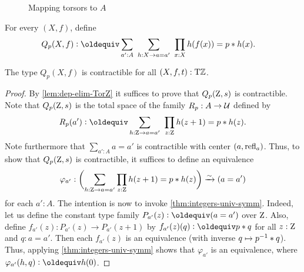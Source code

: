 \documentclass[a4paper,12pt]{amsart}
\begin{document}
\begin{figure}

\caption{\label{fig:TorZ-recursion}Mapping torsors to $A$}
\end{figure}

\begin{definition}\label{def:guided-null-hmtps}
For every $(X,f)$, define
\begin{align*}\label{eq:TBD}
Q_p(X,f)&\defeq \sum_{a':A}~\sum_{h:X\to a=a'}~\prod_{x:X} h(f(x))=p\ct h(x).
\end{align*}
\end{definition}

\begin{lemma}\label{lem:guided-null-hmtps}
The type $Q_p(X,f)$ is contractible for all $(X,f,t):{\mathrm{T}\mathbb{Z}}$.
\end{lemma}
\begin{proof}
  By \cref{lem:dep-elim-TorZ} it suffices to prove that $Q_p(\mathrm{Z},s)$ is contractible.
  Note that $Q_p(\mathrm{Z},s)$ is the total space of the family $R_p : A \to \mathcal{U}$ defined by
  \[
    R_p(a') \defeq \sum_{h:\zet \to a=a'}~\prod_{z:\zet} h(z+1)=p\ct h(z).
  \]
  Note furthermore that $\sum_{a':A} a=a'$ is contractible with center $(a,\mathop{{\mathrm{refl}}_{a}})$.
  Thus, to show that $Q_p(\mathrm{Z},s)$ is contractible,
  it suffices to define an equivalence
  \[
    \varphi_{a'} : \biggl(\sum_{h:\mathrm{Z} \to a=a'}\prod_{z:\mathrm{Z}} h(z+1)=p* h(z)\biggr) \xrightarrow{\sim}{} (a=a')
  \]
  for each $a':A$.
  The intention is now to invoke \cref{thm:integers-univ-symm}.
  Indeed, let us define the constant type family $P_{a'}(z)\defeq(a=a')$
  over $\mathrm{Z}$. Also, define $f_{a'}(z) : P_{a'}(z) \to P_{a'}(z+1)$
  by $f_{a'}(z)(q) \defeq p \ct q$ for all $z:\mathrm{Z}$ and $q: a=a'$.
  Then each $f_{a'}(z)$ is an equivalence (with inverse $q \mapsto p^{-1}* q$).
  Thus, applying \cref{thm:integers-univ-symm}
  shows that $\varphi_{a'}$ is an equivalence,
  where $\varphi_{a'}(h,q) \defeq h(0)$.
\end{proof}
\end{document}
